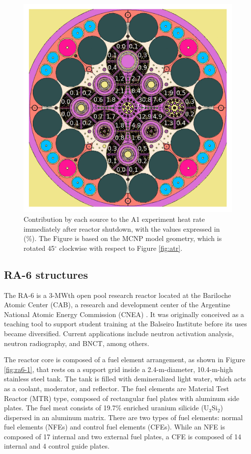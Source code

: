 \documentclass{style/nseJournal}
\begin{document}
\begin{figure}[htbp!] %
    \centering
    \includegraphics[width=0.90\linewidth]{figures/atr_contributions}
    \hfill
    \caption{Contribution by each source to the A1 experiment heat rate immediately after reactor shutdown, with the values expressed in (\%). The Figure is based on the MCNP model geometry, which is rotated 45$^{\circ}$ clockwise with respect to Figure \ref{fig:atr}.}
    \label{fig:atr-contrib}
\end{figure}


\subsection{RA-6 structures}

The RA-6 is a 3-MWth open pool research reactor located at the Bariloche Atomic Center (CAB), a research and development center of the Argentine National Atomic Energy Commission (CNEA) \cite{ICSBEP}.
It was originally conceived as a teaching tool to support student training at the Balseiro Institute before its uses became diversified.
Current applications include neutron activation analysis, neutron radiography, and \gls*{BNCT}, among others.

The reactor core is composed of a fuel element arrangement, as shown in Figure \ref{fig:ra6-1}, that rests on a support grid inside a 2.4-m-diameter, 10.4-m-high stainless steel tank.
The tank is filled with demineralized light water, which acts as a coolant, moderator, and reflector.
The fuel elements are Material Test Reactor (MTR) type, composed of rectangular fuel plates with aluminum side plates.
The fuel meat consists of 19.7\% enriched uranium silicide (U$_3$Si$_2$) dispersed in an aluminum matrix.
There are two types of fuel elements: normal fuel elements (NFEs) and control fuel elements (CFEs).
While an NFE is composed of 17 internal and two external fuel plates, a CFE is composed of 14 internal and 4 control guide plates.
\end{document}
